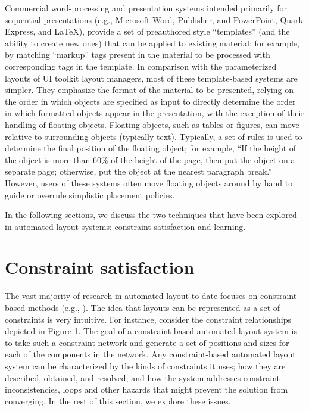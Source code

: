 		Commercial word-processing and presentation systems intended primarily for
		sequential presentations (e.g., Microsoft Word, Publisher, and PowerPoint,
		Quark Express, and LaTeX), provide a set of preauthored style “templates”
		(and the ability to create new ones) that can be applied to existing
		material; for example, by matching “markup” tags present in the material to
		be processed with corresponding tags in the template. In comparison with
		the parameterized layouts of UI toolkit layout managers, most of these
		template-based systems are simpler. They emphasize the format of the
		material to be presented, relying on the order in which objects are
		specified as input to directly determine the order in which formatted
		objects appear in the presentation, with the exception of their handling of
		floating objects. Floating objects, such as tables or figures, can move
		relative to surrounding objects (typically text). Typically, a set of rules
		is used to determine the final position of the floating object; for
		example, “If the height of the object is more than 60\% of the height of
		the page, then put the object on a separate page; otherwise, put the object
		at the nearest paragraph break.” However, users of these systems often move
		floating objects around by hand to guide or overrule simplistic placement
		policies.

		In the following sections, we discuss the two techniques that have been
		explored in automated layout systems: constraint satisfaction and learning.

    \section{Constraint satisfaction}
    \label{constraint-satisfaction}

		The vast majority of research in automated layout to date focuses on
		constraint-based methods (e.g.,
		\citep{vanderzanden-1,borning-1,graf-1,hudson-3,kochhar-1,hudson-2,weitzman-2,myers-2}).
		The idea that layouts can be represented as a set of constraints is very
		intuitive. For instance, consider the constraint relationships depicted in
		Figure 1. The goal of a constraint-based automated layout system is to take
		such a constraint network and generate a set of positions and sizes for
		each of the components in the network. Any constraint-based automated
		layout system can be characterized by the kinds of constraints it uses; how
		they are described, obtained, and resolved; and how the system addresses
		constraint inconsistencies, loops and other hazards that might prevent the
		solution from converging. In the rest of this section, we explore these
		issues.

